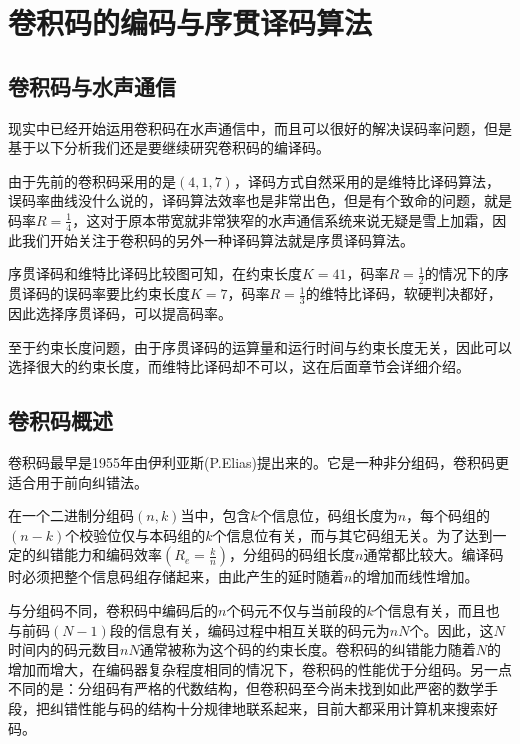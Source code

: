 %
\chapter{卷积码的编码与序贯译码算法}
\thispagestyle{empty}
\section{卷积码与水声通信}
现实中已经开始运用卷积码在水声通信中，而且可以很好的解决误码率问题，但是基于以下分析我们还是要继续研究卷积码的编译码。

由于先前的卷积码采用的是$(4,1,7)$，译码方式自然采用的是维特比译码算法，误码率曲线没什么说的，译码算法效率也是非常出色，但是有个致命的问题，就是码率$R=\frac{1}{4}$，这对于原本带宽就非常狭窄的水声通信系统来说无疑是雪上加霜，因此我们开始关注于卷积码的另外一种译码算法就是序贯译码算法。

序贯译码和维特比译码比较图\cite{Digital_communications}可知，在约束长度$K=41$，码率$R=\frac{1}{2}$的情况下的序贯译码的误码率要比约束长度$K=7$，码率$R=\frac{1}{3}$的维特比译码，软硬判决都好，因此选择序贯译码，可以提高码率。

至于约束长度问题，由于序贯译码的运算量和运行时间与约束长度无关，因此可以选择很大的约束长度，而维特比译码却不可以，这在后面章节会详细介绍。
\section{卷积码概述}
卷积码最早是1955年由伊利亚斯(P.Elias)提出来的。它是一种非分组码，卷积码更适合用于前向纠错法。

在一个二进制分组码$(n,k)$当中，包含$k$个信息位，码组长度为$n$，每个码组的$(n-k)$个校验位仅与本码组的$k$个信息位有关，而与其它码组无关。为了达到一定的纠错能力和编码效率$(R_e=\frac{k}{n})$，分组码的码组长度$n$通常都比较大。编译码时必须把整个信息码组存储起来，由此产生的延时随着$n$的增加而线性增加。

与分组码不同，卷积码中编码后的$n$个码元不仅与当前段的$k$个信息有关，而且也与前码$(N-1)$段的信息有关，编码过程中相互关联的码元为$nN$个。因此，这$N$时间内的码元数目$nN$通常被称为这个码的约束长度。卷积码的纠错能力随着$N$的增加而增大，在编码器复杂程度相同的情况下，卷积码的性能优于分组码。另一点不同的是：分组码有严格的代数结构，但卷积码至今尚未找到如此严密的数学手段，把纠错性能与码的结构十分规律地联系起来，目前大都采用计算机来搜索好码。
